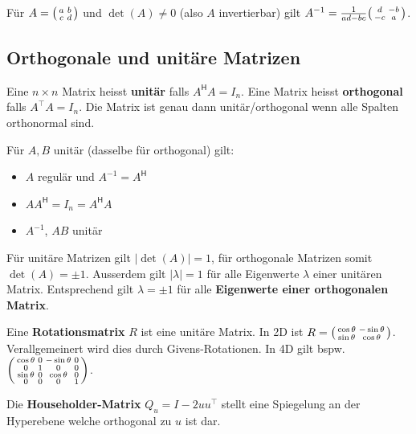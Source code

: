 \documentclass[a4paper,10pt]{article}
\newcommand*{\hermconj}{\mathsf{H}}
\begin{document}
Für $A = \begin{psmallmatrix*}
  a & b \\
  c & d
\end{psmallmatrix*}$ und $\det(A) \neq 0$ (also $A$ invertierbar) gilt $A^{-1} = \frac{1}{ad - bc} \begin{psmallmatrix*}
  d & -b \\
  -c & a
\end{psmallmatrix*}$.

\subsection{Orthogonale und unitäre Matrizen}

Eine $n \times n$ Matrix heisst \textbf{unitär} falls $A^\hermconj A = I_n$. Eine Matrix heisst \textbf{orthogonal} falls $A^\top A = I_n$. Die Matrix ist genau dann unitär/orthogonal wenn alle Spalten orthonormal sind.

Für $A, B$ unitär (dasselbe für orthogonal) gilt:

\begin{itemize}
  \item $A$ regulär und $A^{-1} = A^\hermconj$
  \item $AA^\hermconj = I_n = A^\hermconj A$
  \item $A^{-1}$, $AB$ unitär
\end{itemize}

Für unitäre Matrizen gilt $| \det(A) | = 1$, für orthogonale Matrizen somit $\det(A) = \pm 1$. Ausserdem gilt $| \lambda | = 1$ für alle Eigenwerte $\lambda$ einer unitären Matrix. Entsprechend gilt $\lambda = \pm 1$ für alle \textbf{Eigenwerte einer orthogonalen Matrix}. 

Eine \textbf{Rotationsmatrix} $R$ ist eine unitäre Matrix. In 2D ist $R = \begin{psmallmatrix*}
  \cos \theta & -\sin \theta \\
  \sin \theta & \cos \theta
\end{psmallmatrix*}$. Verallgemeinert wird dies durch Givens-Rotationen. In 4D gilt bspw. $\begin{psmallmatrix}
  \cos \theta & 0 & -\sin \theta & 0 \\
  0 & 1 & 0 & 0 \\
  \sin \theta & 0 & \cos \theta & 0 \\
  0 & 0 & 0 & 1
\end{psmallmatrix}$.

Die \textbf{Householder-Matrix} $Q_u = I - 2uu^\top$ stellt eine Spiegelung an der Hyperebene welche orthogonal zu $u$ ist dar.
\end{document}
